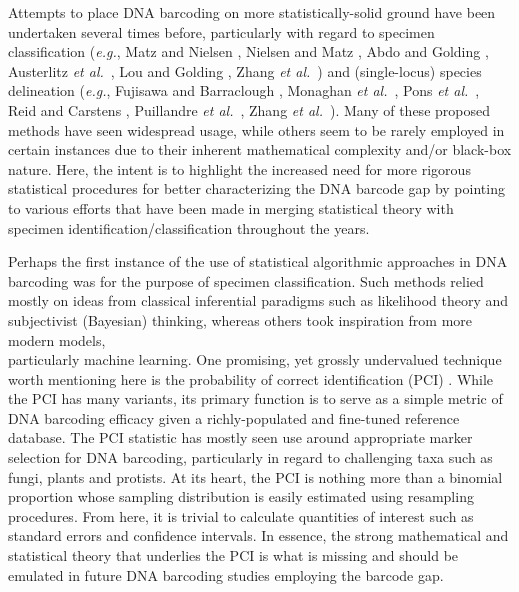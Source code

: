 Attempts to place DNA barcoding on more statistically-solid ground have been \\ undertaken several times before, particularly with regard to specimen classification (\textit{e.g.}, Matz and Nielsen \cite{matz2005likelihood}, Nielsen and Matz \cite{nielsen2006statistical}, Abdo and Golding \cite{abdo2007step}, Austerlitz \textit{et al.}~\cite{austerlitz2009dna}, Lou and Golding \cite{lou2010assigning}, Zhang \textit{et al.}~\cite{zhang2012fuzzy}) and (single-locus) species delineation (\textit{e.g.}, Fujisawa and Barraclough \cite{fujisawa2013delimiting}, Monaghan \textit{et al.}~\cite{monaghan2009accelerated}, Pons \textit{et al.}~\cite{pons2006sequence}, Reid and Carstens \cite{reid2012phylogenetic}, Puillandre \textit{et al.}~\cite{puillandre2011abgd}, Zhang \textit{et al.}~\cite{zhang2013general}). Many of these proposed methods have seen widespread usage, while others seem to be rarely employed in certain instances due to their inherent mathematical complexity and/or black-box nature. Here, the intent is to highlight the increased need for more rigorous statistical procedures for better characterizing the DNA barcode gap by pointing to various efforts that have been made in merging statistical theory with specimen identification/classification throughout the years.

 

Perhaps the first instance of the use of statistical algorithmic approaches in DNA \\ barcoding was for the purpose of specimen classification. Such methods relied mostly on ideas from classical inferential paradigms such as likelihood theory and subjectivist (Bayesian) thinking, whereas others took inspiration from more modern models, \\ particularly machine learning. One promising, yet grossly undervalued technique worth mentioning here is the probability of correct identification (PCI) \cite{martin2020figures, spouge2012practical}. While the PCI has many variants, its primary function is to serve as a simple metric of DNA barcoding efficacy given a richly-populated and fine-tuned reference database. The PCI statistic has mostly seen use around appropriate marker selection for DNA barcoding, particularly in regard to challenging taxa such as fungi, plants and protists. At its heart, the PCI is nothing more than a binomial proportion whose sampling distribution is easily estimated using resampling procedures. From here, it is trivial to calculate quantities of interest such as standard errors and confidence intervals. In essence, the strong mathematical and statistical theory that underlies the PCI is what is missing and should be emulated in future DNA barcoding studies employing the barcode gap.

